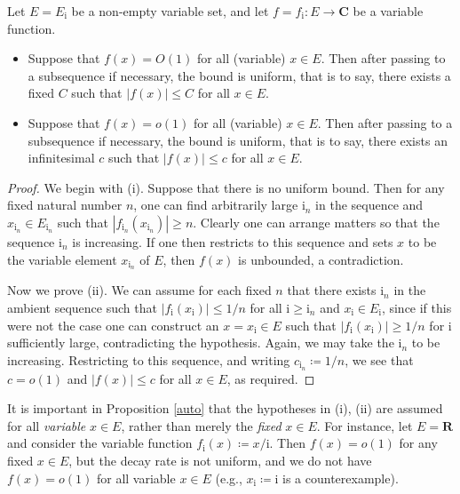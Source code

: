 \documentclass[a4paper, 10pt]{amsart}
\newcommand{\R}{\mathbf{R}}
\newcommand{\C}{\mathbf{C}}
\newcommand{\ii}{{\mathrm{i}}}
\begin{document}
\begin{proposition}\label{auto}  Let $E = E_{\ii}$ be a non-empty variable set, and let $f = f_{\ii}: E \to \C$ be a variable function.  \begin{itemize}
    \item[(i)] Suppose that $f(x)=O(1)$ for all (variable) $x \in E$.  Then after passing to a subsequence if necessary, the bound is uniform, that is to say, there exists a fixed $C$ such that $|f(x)| \leq C$ for all $x \in E$.
    \item[(ii)] Suppose that $f(x)=o(1)$ for all (variable) $x \in E$.  Then after passing to a subsequence if necessary, the bound is uniform, that is to say, there exists an infinitesimal $c$ such that $|f(x)| \leq c$ for all $x \in E$.
\end{itemize}
\end{proposition}

\begin{proof} We begin with (i).  Suppose that there is no uniform bound.  Then for any fixed natural number $n$, one can find arbitrarily large $\ii_n$ in the sequence and $x_{\ii_n} \in E_{\ii_n}$ such that $|f_{\ii_n}(x_{\ii_n})| \geq n$.  Clearly one can arrange matters so that the sequence $\ii_n$ is increasing.  If one then restricts to this sequence and sets $x$ to be the variable element $x_{\ii_n}$ of $E$, then $f(x)$ is unbounded, a contradiction.

Now we prove (ii).  We can assume for each fixed $n$ that there exists $\ii_n$ in the ambient sequence such that $|f_{\ii}(x_{\ii})| \leq 1/n$ for all $\ii \geq \ii_n$ and $x_{\ii} \in E_{\ii}$, since if this were not the case one can construct an $x = x_{\ii} \in E$ such that $|f_{\ii}(x_{\ii})| \geq 1/n$ for $\ii$ sufficiently large, contradicting the hypothesis.  Again, we may take the $\ii_n$ to be increasing.  Restricting to this sequence, and writing $c_{\ii_n} \coloneqq 1/n$, we see that $c=o(1)$ and $|f(x)| \leq c$ for all $x \in E$, as required.
\end{proof}

\begin{remark} It is important in Proposition \ref{auto} that the hypotheses in (i), (ii) are assumed for all \emph{variable} $x \in E$, rather than merely the \emph{fixed} $x \in E$.  For instance, let $E = \R$ and consider the variable function $f_{\ii}(x) \coloneqq x/\ii$.  Then $f(x) = o(1)$ for any fixed $x \in E$, but the decay rate is not uniform, and we do not have $f(x) = o(1)$ for all variable $x \in E$ (e.g., $x_\ii \coloneqq \ii$ is a counterexample).
\end{remark}
\end{document}
